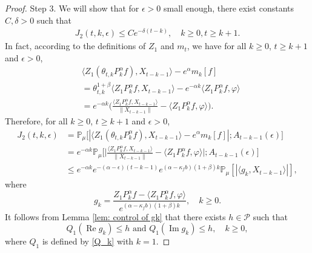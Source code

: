 \documentclass[12pt,a4paper]{amsart}
\theoremstyle{plain}
\theoremstyle{definition}
\numberwithin{equation}{section}
\begin{document}
\begin{proof}
    Step 3.
    We will show that for $\epsilon>0$ small enough, there exist constants $C, \delta>0$ such that
\begin{equation}\begin{split}
\label{eq:31step3}
    J_2(t,k,\epsilon)
    \leq Ce^{-\delta (t-k)},
    \quad k\geq 0, t\geq k+1.
\end{split}\end{equation}
    In fact, according to the definitions of $Z_1$ and $m_t$, we have for all $k\geq 0$, $t\geq k+1$ and $\epsilon> 0$,
\begin{equation}\begin{split}
    &\langle Z_1(\theta_{t,k}P^\alpha_k f),X_{t-k-1}\rangle-e^{\alpha}m_k[f]
    \\&= \theta_{t,k}^{1+\beta} \langle Z_1P^\alpha_k f,X_{t-k-1}\rangle - e^{-\alpha k}\langle  Z_1P^\alpha_k f,\varphi\rangle
    \\&=e^{-\alpha k}\Big(\frac{\langle Z_1P^\alpha_k f ,X_{t-k-1}\rangle}{\|X_{t-k-1}\|}-\langle  Z_1P^\alpha_k f ,\varphi\rangle\Big).
\end{split}\end{equation}
    Therefore, for all $k\geq 0$, $t\geq k+1$ and $\epsilon> 0$,
\begin{equation}\begin{split}
\label{eq: prevJ2}
    J_2(t,k,\epsilon)&
    = \mathbb P_\mu\big[|\langle Z_1(\theta_{t,k}P^\alpha_k f),X_{t-k-1}\rangle-e^{\alpha}m_k[f]|;A_{t-k-1}(\epsilon)\big]
    \\&=e^{-\alpha k}\mathbb{P}_{\mu}\bigg[\Big|\frac{\langle Z_1P^{\alpha}_k f,X_{t-k-1}\rangle}{\|X_{t-k-1}\|}-\langle  Z_1P^{\alpha}_k f,\varphi\rangle\Big|;A_{t-k-1}(\epsilon)\bigg]\nonumber\\
    &\leq e^{-\alpha k}e^{-(\alpha-\epsilon)(t-k-1)}e^{(\alpha-\kappa_f b)(1+\beta)k} \mathbb{P}_{\mu}\left[\left|\langle g_k,X_{t-k-1}\rangle\right|\right],
\end{split}\end{equation}
where
\[
    g_k
    = \frac{Z_1 P^{\alpha}_k f-\langle  Z_1P^{\alpha}_k f,\varphi\rangle}{e^{(\alpha-\kappa_f b)(1+\beta)k}},
    \quad k \geq 0.
\]
    It follows from Lemma \ref{lem: control of gk} that there exists $h\in \mathcal{P}$ such that
 \[
    Q_1 (\operatorname{Re} g_k) \leq h
    \text{ and } Q_1 (\operatorname{Im} g_k)\leq h,
    \quad k \geq 0,
 \]
    where $Q_1$ is defined by \eqref{Q_k} with $k=1$.


\end{proof}
\end{document}
